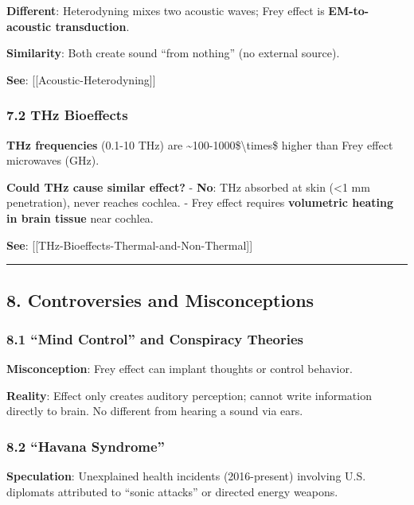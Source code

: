 \textbf{Different}: Heterodyning mixes two acoustic waves; Frey effect
is \textbf{EM-to-acoustic transduction}.

\textbf{Similarity}: Both create sound ``from nothing'' (no external
source).

\textbf{See}: {[}{[}Acoustic-Heterodyning{]}{]}

\subsubsection{7.2 THz Bioeffects}\label{thz-bioeffects}

\textbf{THz frequencies} (0.1-10 THz) are
\textasciitilde100-1000\$\textbackslash times\$ higher than Frey effect
microwaves (GHz).

\textbf{Could THz cause similar effect?} - \textbf{No}: THz absorbed at
skin (\textless1 mm penetration), never reaches cochlea. - Frey effect
requires \textbf{volumetric heating in brain tissue} near cochlea.

\textbf{See}: {[}{[}THz-Bioeffects-Thermal-and-Non-Thermal{]}{]}

\begin{center}\rule{0.5\linewidth}{0.5pt}\end{center}

\subsection{8. Controversies and
Misconceptions}\label{controversies-and-misconceptions}

\subsubsection{8.1 ``Mind Control'' and Conspiracy
Theories}\label{mind-control-and-conspiracy-theories}

\textbf{Misconception}: Frey effect can implant thoughts or control
behavior.

\textbf{Reality}: Effect only creates auditory perception; cannot write
information directly to brain. No different from hearing a sound via
ears.

\subsubsection{8.2 ``Havana Syndrome''}\label{havana-syndrome}

\textbf{Speculation}: Unexplained health incidents (2016-present)
involving U.S. diplomats attributed to ``sonic attacks'' or directed
energy weapons.

